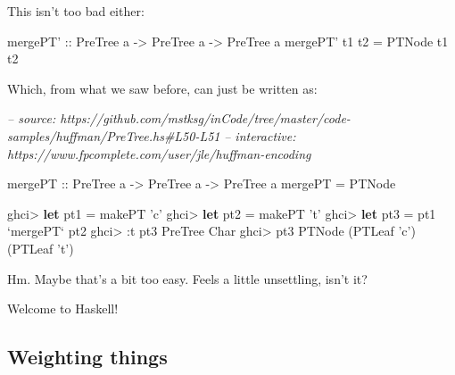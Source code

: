 \documentclass[]{article}
\newenvironment{Shaded}{}{}
\newcommand{\CharTok}[1]{\textcolor[rgb]{0.25,0.44,0.63}{#1}}
\newcommand{\CommentTok}[1]{\textcolor[rgb]{0.38,0.63,0.69}{\textit{#1}}}
\newcommand{\DataTypeTok}[1]{\textcolor[rgb]{0.56,0.13,0.00}{#1}}
\newcommand{\FunctionTok}[1]{\textcolor[rgb]{0.02,0.16,0.49}{#1}}
\newcommand{\KeywordTok}[1]{\textcolor[rgb]{0.00,0.44,0.13}{\textbf{#1}}}
\newcommand{\NormalTok}[1]{#1}
\newcommand{\OtherTok}[1]{\textcolor[rgb]{0.00,0.44,0.13}{#1}}
\begin{document}
This isn't too bad either:

\begin{Shaded}
\begin{Highlighting}[]
\OtherTok{mergePT' ::} \DataTypeTok{PreTree}\NormalTok{ a }\OtherTok{->} \DataTypeTok{PreTree}\NormalTok{ a }\OtherTok{->} \DataTypeTok{PreTree}\NormalTok{ a}
\NormalTok{mergePT' t1 t2 }\FunctionTok{=} \DataTypeTok{PTNode}\NormalTok{ t1 t2}
\end{Highlighting}
\end{Shaded}

Which, from what we saw before, can just be written as:

\begin{Shaded}
\begin{Highlighting}[]
\CommentTok{-- source: https://github.com/mstksg/inCode/tree/master/code-samples/huffman/PreTree.hs#L50-L51}
\CommentTok{-- interactive: https://www.fpcomplete.com/user/jle/huffman-encoding}

\OtherTok{mergePT ::} \DataTypeTok{PreTree}\NormalTok{ a }\OtherTok{->} \DataTypeTok{PreTree}\NormalTok{ a }\OtherTok{->} \DataTypeTok{PreTree}\NormalTok{ a}
\NormalTok{mergePT }\FunctionTok{=} \DataTypeTok{PTNode}
\end{Highlighting}
\end{Shaded}

\begin{Shaded}
\begin{Highlighting}[]
\NormalTok{ghci}\FunctionTok{>} \KeywordTok{let}\NormalTok{ pt1 }\FunctionTok{=}\NormalTok{ makePT }\CharTok{'c'}
\NormalTok{ghci}\FunctionTok{>} \KeywordTok{let}\NormalTok{ pt2 }\FunctionTok{=}\NormalTok{ makePT }\CharTok{'t'}
\NormalTok{ghci}\FunctionTok{>} \KeywordTok{let}\NormalTok{ pt3 }\FunctionTok{=}\NormalTok{ pt1 }\OtherTok{`mergePT`}\NormalTok{ pt2}
\NormalTok{ghci}\FunctionTok{>} \FunctionTok{:}\NormalTok{t pt3}
\DataTypeTok{PreTree} \DataTypeTok{Char}
\NormalTok{ghci}\FunctionTok{>}\NormalTok{ pt3}
\DataTypeTok{PTNode}\NormalTok{ (}\DataTypeTok{PTLeaf} \CharTok{'c'}\NormalTok{) (}\DataTypeTok{PTLeaf} \CharTok{'t'}\NormalTok{)}
\end{Highlighting}
\end{Shaded}

Hm. Maybe that's a bit too easy. Feels a little unsettling, isn't it?

Welcome to Haskell!

\hypertarget{weighting-things}{%
\subsection{Weighting things}\label{weighting-things}}
\end{document}

